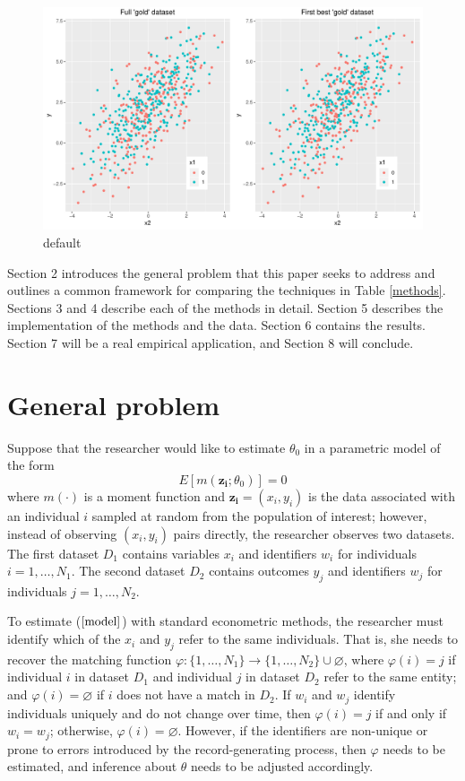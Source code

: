 \documentclass[12pt]{article}
\begin{document}
\begin{figure}[htbp]
\begin{center}
\includegraphics[width=\textwidth]{./Figures/gold_data_compare.pdf}
\caption{default}
\label{default}
\end{center}
\end{figure}

Section 2 introduces the general problem that this paper seeks to address and outlines a common framework for comparing the techniques in Table \ref{methods}.  Sections 3 and 4 describe each of the methods in detail. Section 5 describes the implementation of the methods and the data.  Section 6 contains the results.  Section 7 will be a real empirical application, and Section 8 will conclude.

\section{General problem}
Suppose that the researcher would like to estimate $\theta_0$ in a parametric model of the form
\begin{equation} E[m(\mathbf{z_i}; \theta_0)] = 0 \label{model} \end{equation}
where $m(\cdot)$ is a moment function and $\mathbf{z_i} = (x_i, y_i)$ is the data associated with an individual $i$ sampled at random from the population of interest; however, instead of observing $(x_i, y_i)$ pairs directly, the researcher observes two datasets.  The first dataset $D_1$ contains variables $x_i$ and identifiers $w_i$ for individuals $i = 1, \dots, N_1$.  The second dataset $D_2$ contains outcomes $y_j$ and identifiers $w_j$ for individuals $j=1,\dots, N_2$.

To estimate ($\ref{model}$) with standard econometric methods, the researcher must identify which of the $x_i$ and $y_j$ refer to the same individuals.   That is, she needs to recover the matching function $\varphi: \{1,\dots, N_1\} \to \{1,\dots, N_2\} \cup \varnothing$, where $\varphi(i) = j$ if individual $i$ in dataset $D_1$ and individual $j$ in dataset $D_2$ refer to the same entity; and $\varphi(i) = \varnothing$ if $i$ does not have a match in $D_2$.  If $w_i$ and $w_j$ identify individuals uniquely and do not change over time, then $\varphi(i) = j$ if and only if $w_i = w_j$; otherwise, $\varphi(i) = \varnothing$.  However, if the identifiers are non-unique or prone to errors introduced by the record-generating process, then $\varphi$ needs to be estimated, and inference about $\theta$ needs to be adjusted accordingly.   
\end{document}
